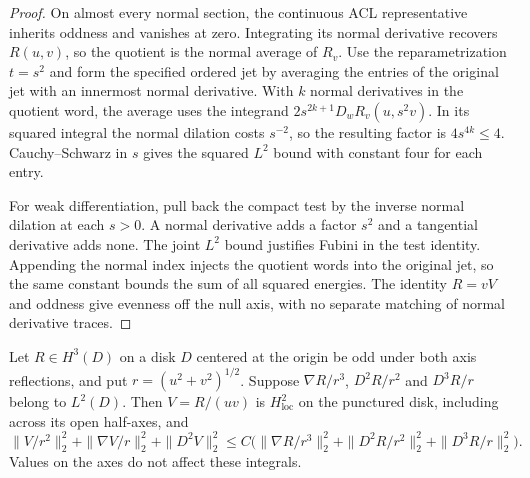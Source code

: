 \begin{proof}
\leanok
On almost every normal section, the continuous ACL representative
inherits oddness and vanishes at zero. Integrating its normal derivative
recovers $R(u,v)$, so the quotient is the normal average of $R_v$.
Use the reparametrization $t=s^2$ and form the specified ordered jet
by averaging the entries of the original jet with an innermost normal
derivative. With $k$ normal derivatives in the quotient word, the average
uses the integrand $2s^{2k+1}D_wR_v(u,s^2 v)$.
In its squared integral the normal dilation costs $s^{-2}$, so the
resulting factor is $4s^{4k}\le4$. Cauchy--Schwarz in $s$ gives the
squared $L^2$ bound with constant four for each entry.

For weak differentiation, pull back the compact test by the inverse
normal dilation at each $s>0$. A normal derivative adds a factor
$s^2$ and a tangential derivative adds none. The joint $L^2$ bound
justifies Fubini in the test identity. Appending the normal index
injects the quotient words into the original jet, so the same constant
bounds the sum of all squared energies. The identity $R=vV$ and
oddness give evenness off the null axis, with no separate matching
of normal derivative traces.
\end{proof}

\begin{lemma}
\label{lem:weighted-double-division}
\leanok
Let $R\in H^3(D)$ on a disk $D$ centered at the origin be odd under both
axis reflections, and put $r=(u^2+v^2)^{1/2}$. Suppose
$\nabla R/r^3$, $D^2R/r^2$ and $D^3R/r$ belong to $L^2(D)$.
Then $V=R/(uv)$ is $H^2_{\mathrm{loc}}$ on the punctured disk, including
across its open half-axes, and
\[
 \|V/r^2\|_2^2+\|\nabla V/r\|_2^2+\|D^2V\|_2^2
 \le C\bigl(\|\nabla R/r^3\|_2^2+\|D^2R/r^2\|_2^2+\|D^3R/r\|_2^2\bigr).
\]
Values on the axes do not affect these integrals.
\end{lemma}

